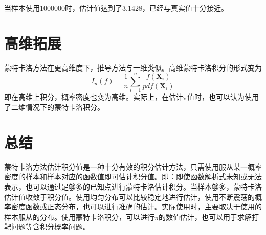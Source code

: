 \documentclass[a4paper]{IEEEtran}
\begin{document}
	当样本使用1000000时，估计值达到了3.1428，已经与真实值十分接近。

	\section{高维拓展}
	蒙特卡洛方法在更高维度下，推导方法与一维类似。高维蒙特卡洛积分的形式变为
	$$
	I_n(f)=\frac{1}{n} \sum_{i=1}^n \frac{f\left(\boldsymbol X_i\right)}{p d f\left(\boldsymbol X_i\right)}
	$$
	即在高维上积分，概率密度也变为高维。实际上，在估计$\pi$值时，也可以认为使用了二维情况下的蒙特卡洛积分。
	\section{总结}
	蒙特卡洛方法估计积分值是一种十分有效的积分估计方法，只需使用服从某一概率密度的样本和样本对应的函数值即可估计积分值。即：即使函数解析式未知或无法表示，也可以通过足够多的已知点进行蒙特卡洛估计积分。当样本够多，蒙特卡洛估计值收敛于积分值。使用均匀分布可以比较稳定地进行估计，使用不断震荡的概率密度函数或正态分布，也可以进行准确的估计。实际使用时，主要取决于使用的样本服从的分布。使用蒙特卡洛积分，可以进行$\pi$的数值估计，也可以用于求解打靶问题等含积分概率问题。
\end{document}
